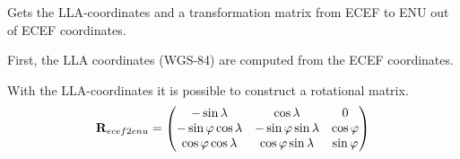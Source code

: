 Gets the LLA-coordinates and a transformation matrix from ECEF to ENU out of ECEF coordinates.

First, the LLA coordinates (WGS-84) are computed from the ECEF coordinates. 

With the LLA-coordinates it is possible to construct a rotational matrix.
\begin{equation}
\mat R_{ecef2enu} = \begin{pmatrix}
-\sin \lon				& \cos \lon				&		0	\\
-\sin \lat \cos \lon	& -\sin \lat \sin \lon	& \cos \lat	\\
\cos \lat \cos \lon		& \cos \lat \sin \lon	& \sin \lat	
\end{pmatrix}
\end{equation}
